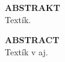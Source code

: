  \newpage
 \begin{minipage}[t]{7.37cm}
 		\raggedright
 	\textcolor{ctublue}{\Large{\textbf{\MakeTextUppercase{Abstrakt}}}}\\
    Textík.
	
 \end{minipage}%
 \hfill%
 \begin{minipage}[t]{7.37cm}
 		\textcolor{ctublue}{\Large{\textbf{\MakeTextUppercase{Abstract}}}}\\
	Textík v aj.	
 \end{minipage}


